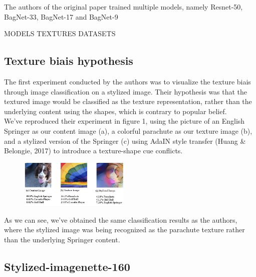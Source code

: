 \documentclass{article}
\begin{document}
The authors of the original paper trained multiple models, 
namely Resnet-50, BagNet-33, BagNet-17 and BagNet-9

MODELS
TEXTURES
DATASETS

\subsection{Texture biais hypothesis}

The first experiment conducted by the authors was to visualize the texture biais 
through image classification on a stylized image. 
Their hypothesis was that the textured image would be classified as the texture representation, rather than 
the underlying content using the shapes, which is contrary to popular belief. \\
\noindent
We've reproduced their experiment in figure 1, %
using the picture of an English Springer as our content image (a), 
a colorful parachute as our texture image (b),
and a stylized version of the Springer (c) using AdaIN style transfer 
(Huang \& Belongie, 2017) %
to introduce a texture-shape cue conflicts.

\begin{figure}[h!]\center
  \includegraphics[width=0.47\textwidth]{imgs/results-textures}
\end{figure}

\noindent
As we can see, we've obtained the same classification results as the authors, 
where the stylized image was being recognized as the parachute texture
rather than the underlying Springer content.

\subsection{Stylized-imagenette-160}
\end{document}
